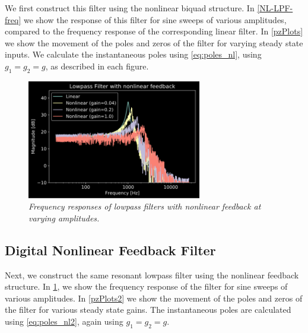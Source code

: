 \documentclass{IEEEtran}
\begin{document}
We first construct this filter using the nonlinear biquad structure.
In \cref{NL-LPF-freq} we show the response of this filter for sine sweeps of
various amplitudes, compared to the frequency response of the corresponding
linear filter. In \cref{pzPlots} we show the movement of the poles and zeros of
the filter for varying steady state inputs. We calculate the instantaneous
poles using \cref{eq:poles_nl}, using $g_1 = g_2 = g$, as described in
each figure.
%
\begin{figure}[ht]
    \center
    \includegraphics[width=3in]{../../NonlinearFeedback/Pics/LPF-NL.png}
    \caption{\label{NL2-LPF-freq}{\it Frequency responses of lowpass
                                    filters with nonlinear feedback
                                    at varying amplitudes.}}
\end{figure}
%

\subsection{Digital Nonlinear Feedback Filter}
%
Next, we construct the same resonant lowpass filter
using the nonlinear feedback structure. In \cref{NL2-LPF-freq},
we show the frequency response of the filter for sine sweeps of
various amplitudes. In \cref{pzPlots2} we show the movement of the
poles and zeros of the filter for various steady state gains. The
instantaneous poles are calculated using \cref{eq:poles_nl2}, again
using $g_1 = g_2 = g$.
\end{document}

